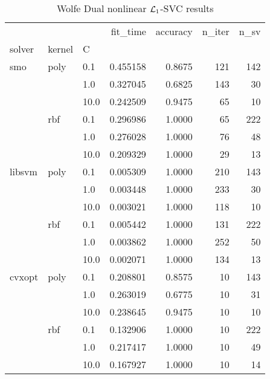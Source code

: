 \begin{table}[H]
\centering
\caption{Wolfe Dual nonlinear $\protect \mathcal{L}_1$-SVC results}
\label{nonlinear_dual_l1_svc_cv_results}
\begin{tabular}{lllrrrr}
\toprule
       &     &      &  fit\_time &  accuracy &  n\_iter &  n\_sv \\
solver & kernel & C &           &           &         &       \\
\midrule
smo & poly & 0.1  &  0.455158 &    0.8675 &     121 &   142 \\
       &     & 1.0  &  0.327045 &    0.6825 &     143 &    30 \\
       &     & 10.0 &  0.242509 &    0.9475 &      65 &    10 \\
       & rbf & 0.1  &  0.296986 &    1.0000 &      65 &   222 \\
       &     & 1.0  &  0.276028 &    1.0000 &      76 &    48 \\
       &     & 10.0 &  0.209329 &    1.0000 &      29 &    13 \\
libsvm & poly & 0.1  &  0.005309 &    1.0000 &     210 &   143 \\
       &     & 1.0  &  0.003448 &    1.0000 &     233 &    30 \\
       &     & 10.0 &  0.003021 &    1.0000 &     118 &    10 \\
       & rbf & 0.1  &  0.005442 &    1.0000 &     131 &   222 \\
       &     & 1.0  &  0.003862 &    1.0000 &     252 &    50 \\
       &     & 10.0 &  0.002071 &    1.0000 &     134 &    13 \\
cvxopt & poly & 0.1  &  0.208801 &    0.8575 &      10 &   143 \\
       &     & 1.0  &  0.263019 &    0.6775 &      10 &    31 \\
       &     & 10.0 &  0.238645 &    0.9475 &      10 &    10 \\
       & rbf & 0.1  &  0.132906 &    1.0000 &      10 &   222 \\
       &     & 1.0  &  0.217417 &    1.0000 &      10 &    49 \\
       &     & 10.0 &  0.167927 &    1.0000 &      10 &    14 \\
\bottomrule
\end{tabular}
\end{table}
